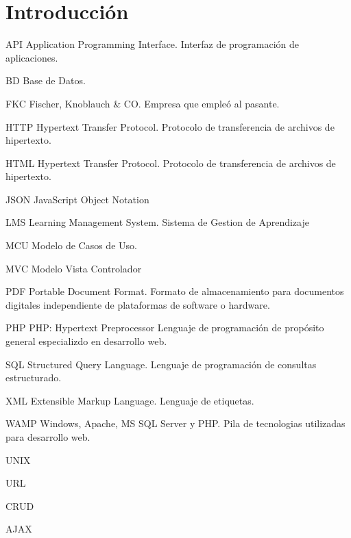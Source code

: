 \chapter*{Introducción}
\thispagestyle{empty} %

API
Application Programming Interface. Interfaz de programación de aplicaciones.

BD
Base de Datos.

FKC
Fischer, Knoblauch \& CO. Empresa que empleó al pasante.

HTTP
Hypertext Transfer Protocol. Protocolo de transferencia de archivos de hipertexto.

HTML
Hypertext Transfer Protocol. Protocolo de transferencia de archivos de hipertexto.

JSON
JavaScript Object Notation

LMS
Learning Management System. Sistema de Gestion de Aprendizaje

MCU
Modelo de Casos de Uso.

MVC
Modelo Vista Controlador

PDF Portable Document Format. 
Formato de almacenamiento para documentos digitales independiente de plataformas de software o hardware.

PHP 
PHP: Hypertext Preprocessor
Lenguaje de programación de propósito general especializdo en desarrollo web.

SQL
Structured Query Language. Lenguaje de programación de consultas estructurado.

XML
Extensible Markup Language. Lenguaje de etiquetas.

WAMP
Windows, Apache, MS SQL Server y PHP. Pila de tecnologias utilizadas para desarrollo web.

UNIX

URL

CRUD

AJAX